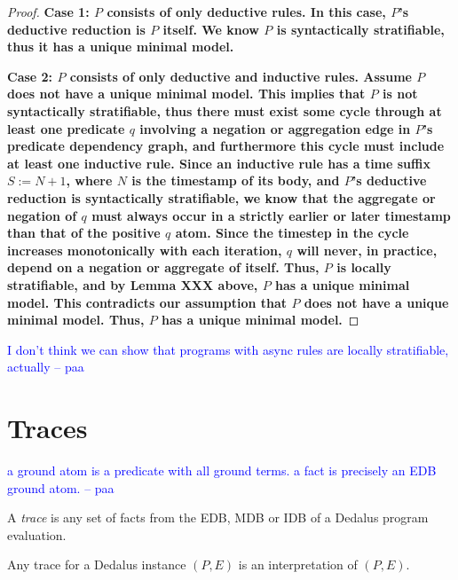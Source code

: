\documentclass{acm_proc_article-sp-sigmod09}
\newcommand{\paa}[1]{{\textcolor{blue}{#1 -- paa}}}
\newcommand{\wrm}[1]{{\color{BurntOrange}{#1 -- wrm}}}
\begin{document}
\begin{proof}
%
\bf{Case 1:} $P$ consists of only deductive rules.  In this case, $P$'s
deductive reduction is $P$ itself.  We know $P$ is syntactically stratifiable,
thus it has a unique minimal model.

\bf{Case 2:} $P$ consists of only deductive and inductive rules.  Assume $P$
does not have a unique minimal model.  This implies that $P$ is not
syntactically stratifiable, thus there must exist some cycle through at least
one predicate $q$ involving a negation or aggregation edge in $P$'s predicate
dependency graph, and furthermore this cycle must include at least one
inductive rule.  Since an inductive rule has a time suffix $S := N+1$, where
$N$ is the timestamp of its body, and $P$'s deductive reduction is
syntactically stratifiable, we know that the aggregate or negation of $q$ must
always occur in a strictly earlier or later timestamp than that of the positive
$q$ atom.  Since the timestep in the cycle increases monotonically with each
iteration, $q$ will never, in practice, depend on a negation or aggregate of
itself.  Thus, $P$ is locally stratifiable, and by Lemma XXX above, $P$ has a
unique minimal model.  This contradicts our assumption that $P$ does not have a
unique minimal model.  Thus, $P$ has a unique minimal model.
%
\end{proof}

\paa{I don't think we can show that programs with async rules are locally stratifiable, actually}
\wrm{Why not?  What if we have that "causality constraint" we were talking about?}

\section{Traces}

\wrm{I don't know what you mean by ground atoms, so I changed "ground atom" to fact}
\paa{a ground atom is  a predicate with all ground terms.  a fact is precisely an EDB ground atom.}


\begin{definition}
A \emph{trace} is any set of facts from the EDB, MDB or IDB of a Dedalus program evaluation.
\end{definition}

Any trace for a Dedalus instance $(P,E)$ is an interpretation of $(P,E)$.
\end{document}
